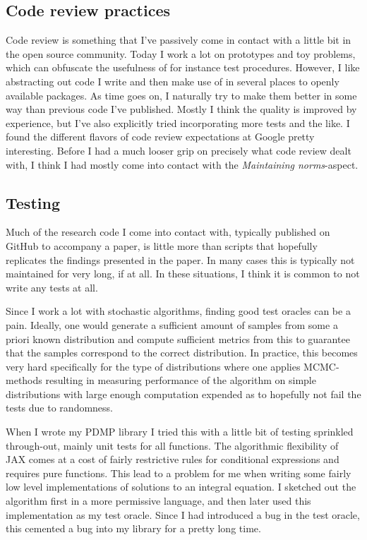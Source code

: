 \documentclass[11pt]{diazessay}
\begin{document}
\subsection*{Code review practices}

Code review is something that I've passively come in contact with a little bit in the open source community. Today I work a lot on prototypes and toy problems, which can obfuscate the usefulness of for instance test procedures. However, I like abstracting out code I write and then make use of in several places to openly available packages. As time goes on, I naturally try to make them better in some way than previous code I've published. Mostly I think the quality is improved by experience, but I've also explicitly tried incorporating more tests and the like. I found the different flavors of code review expectations at Google pretty interesting. Before I had a much looser grip on precisely what code review dealt with, I think I had mostly come into contact with the \textit{Maintaining norms}-aspect.

\subsection*{Testing}

Much of the research code I come into contact with, typically published on GitHub to accompany a paper, is little more than scripts that hopefully replicates the findings presented in the paper. In many cases this is typically not maintained for very long, if at all. In these situations, I think it is common to not write any tests at all.

Since I work a lot with stochastic algorithms, finding good test oracles can be a pain. Ideally, one would generate a sufficient amount of samples from some a priori known distribution and compute sufficient metrics from this to guarantee that the samples correspond to the correct distribution. In practice, this becomes very hard specifically for the type of distributions where one applies MCMC-methods resulting in measuring performance of the algorithm on simple distributions with large enough computation expended as to hopefully not fail the tests due to randomness. 

When I wrote my PDMP library I tried this with a little bit of testing sprinkled through-out, mainly unit tests for all functions. The algorithmic flexibility of JAX comes at a cost of fairly restrictive rules for conditional expressions and requires pure functions. This lead to a problem for me when writing some fairly low level implementations of solutions to an integral equation. I sketched out the algorithm first in a more permissive language, and then later used this implementation as my test oracle. Since I had introduced a bug in the test oracle, this cemented a bug into my library for a pretty long time. 
\end{document}
